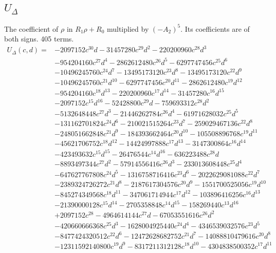\subsection*{$U_\Delta$}
The coefficient of $\rho$ in $R_1\rho+R_0$ multiplied by $(-A_2)^5$. Its coefficients are of both signs. 405 terms.
{\small
\begin{align*}
U_\Delta(c,d)={}&-2097152c^{30}d-31457280c^{29}d^{2}-220200960c^{28}d^{3}\\
&-954204160c^{27}d^{4}-2862612480c^{26}d^{5}-6297747456c^{25}d^{6}\\
&-10496245760c^{24}d^{7}-13495173120c^{23}d^{8}-13495173120c^{22}d^{9}\\
&-10496245760c^{21}d^{10}-6297747456c^{20}d^{11}-2862612480c^{19}d^{12}\\
&-954204160c^{18}d^{13}-220200960c^{17}d^{14}-31457280c^{16}d^{15}\\
&-2097152c^{15}d^{16}-52428800c^{29}d-759693312c^{28}d^{2}\\
&-5132648448c^{27}d^{3}-21446262784c^{26}d^{4}-61971628032c^{25}d^{5}\\
&-131162701824c^{24}d^{6}-210021515264c^{23}d^{7}-259029467136c^{22}d^{8}\\
&-248051662848c^{21}d^{9}-184393662464c^{20}d^{10}-105508896768c^{19}d^{11}\\
&-45621706752c^{18}d^{12}-14424997888c^{17}d^{13}-3147300864c^{16}d^{14}\\
&-423493632c^{15}d^{15}-26476544c^{14}d^{16}-636223488c^{28}d\\
&-8893497344c^{27}d^{2}-57914556416c^{26}d^{3}-233013608448c^{25}d^{4}\\
&-647627767808c^{24}d^{5}-1316758716416c^{23}d^{6}-2022629081088c^{22}d^{7}\\
&-2389324726272c^{21}d^{8}-2187617304576c^{20}d^{9}-1551700525056c^{19}d^{10}\\
&-845274349568c^{18}d^{11}-347061714944c^{17}d^{12}-103896416256c^{16}d^{13}\\
&-21390000128c^{15}d^{14}-2705358848c^{14}d^{15}-158269440c^{13}d^{16}\\
&+2097152c^{28}-4964614144c^{27}d-67053551616c^{26}d^{2}\\
&-420660666368c^{25}d^{3}-1628004925440c^{24}d^{4}-4346539032576c^{23}d^{5}\\
&-8477424320512c^{22}d^{6}-12472628682752c^{21}d^{7}-14088810479616c^{20}d^{8}\\
&-12311592140800c^{19}d^{9}-8317211312128c^{18}d^{10}-4304838500352c^{17}d^{11}\\

\end{align*}}

